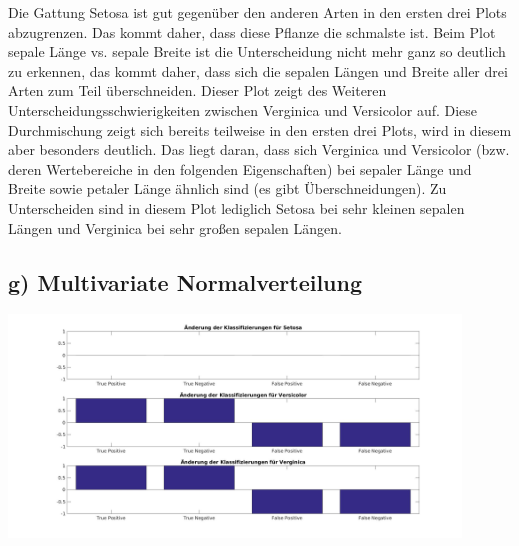 \documentclass{scrartcl}
\begin{document}
Die Gattung Setosa ist gut gegenüber den anderen Arten in den ersten drei Plots abzugrenzen.
Das kommt daher, dass diese Pflanze die schmalste ist. 
Beim Plot sepale Länge vs. sepale Breite ist die Unterscheidung nicht mehr ganz so deutlich zu erkennen, das kommt daher, dass sich die sepalen Längen und Breite aller drei Arten zum Teil überschneiden.
Dieser Plot zeigt des Weiteren Unterscheidungsschwierigkeiten zwischen Verginica und Versicolor auf. 
Diese Durchmischung zeigt sich bereits teilweise in den ersten drei Plots, wird in diesem aber besonders deutlich. 
Das liegt daran, dass sich Verginica und Versicolor (bzw. deren Wertebereiche in den folgenden Eigenschaften) bei sepaler Länge und Breite sowie petaler Länge ähnlich sind (es gibt Überschneidungen). Zu Unterscheiden sind in diesem Plot lediglich Setosa bei sehr kleinen sepalen Längen und Verginica bei sehr großen sepalen Längen.



\subsection*{g) Multivariate Normalverteilung}

\includegraphics[width=0.9\textwidth]{plots/diffsAll.jpg} 
\end{document}
